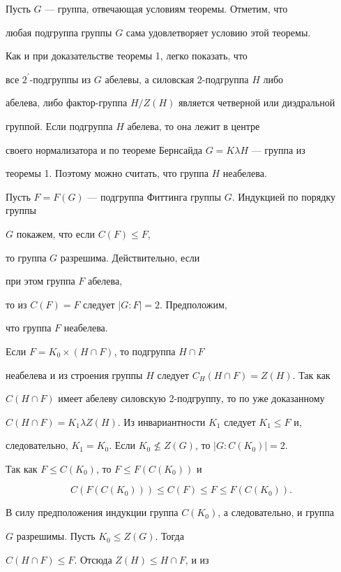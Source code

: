 \begin{pf}


Пусть $G$ --- группа, отвечающая условиям теоремы. Отметим, что


любая подгруппа группы $G$ сама удовлетворяет условию этой теоремы.


Как и при доказательстве теоремы 1, легко показать, что


все $2^\prime$-подгруппы из $G$ абелевы, а силовская 2-подгруппа $H$ либо


абелева, либо фактор-группа $H/Z(H)$ является четверной или диэдральной


 группой. Если подгруппа $H$ абелева, то она лежит в центре


своего нормализатора и по теореме Бернсайда $G=K\lambda H$ --- группа из


теоремы 1. Поэтому можно считать, что группа $H$ неабелева.





Пусть $F=F(G)$ --- подгруппа Фиттинга группы $G$. Индукцией по порядку группы


$G$ покажем, что если $C(F)\le F$, 


то группа $G$ разрешима. Действительно, если


при этом группа $F$ абелева, 


то из $C(F)=F$ следует $|G:F|=2$. Предположим,


что группа $F$ неабелева. 


Если $F=K_0\times(H\cap F)$, то подгруппа $H\cap F$


неабелева и из строения группы $H$ следует $C_H(H\cap F)=Z(H)$. Так как


$C(H\cap F)$ имеет абелеву силовскую 2-подгруппу, то по уже доказанному


$C(H\cap F)=K_1\lambda Z(H)$. Из инвариантности $K_1$ следует $K_1\le F$ и,


следовательно, $K_1=K_0$. Если $K_0\not\le Z(G)$, то $|G:C(K_0)|=2$.


Так как $F\le C(K_0)$, то $F\le F(C(K_0))$ и


$$


C(F(C(K_0)))\le C(F)\le F\le F(C(K_0)).


$$


В силу предположения индукции группа $C(K_0)$, а следовательно, и группа


$G$ разрешимы. Пусть $K_0\le Z(G)$. Тогда


$C(H\cap F)\le F$. Отсюда $Z(H)\le H\cap F$, и из



\end{pf}
